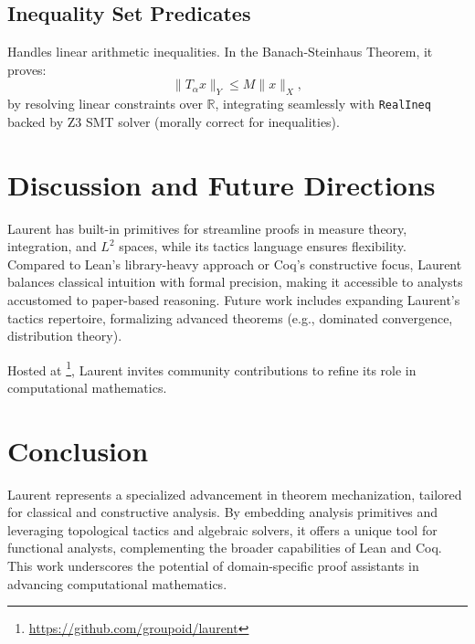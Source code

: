 \documentclass{article}
\begin{document}
\subsection{Inequality Set Predicates}

Handles linear arithmetic inequalities. In the Banach-Steinhaus Theorem, it proves:
\[
\| T_\alpha x \|_Y \leq M \| x \|_X,
\]
by resolving linear constraints over $\mathbb{R}$, integrating seamlessly with \texttt{RealIneq} backed by Z3 SMT solver (morally correct for inequalities).

\section{Discussion and Future Directions}
Laurent has built-in primitives for streamline proofs in measure theory, integration, and $L^2$ spaces,
while its tactics language ensures flexibility. Compared to Lean’s library-heavy approach
or Coq’s constructive focus, Laurent balances classical intuition with formal precision,
making it accessible to analysts accustomed to paper-based reasoning. Future work includes
expanding Laurent’s tactics repertoire, formalizing advanced
theorems (e.g., dominated convergence, distribution theory).

Hosted at \footnote{\url{https://github.com/groupoid/laurent}}, Laurent invites community
contributions to refine its role in computational mathematics.

\section{Conclusion}
Laurent represents a specialized advancement in theorem mechanization,
tailored for classical and constructive analysis. By embedding analysis
primitives and leveraging topological tactics and algebraic solvers,
it offers a unique tool for functional analysts, complementing the
broader capabilities of Lean and Coq. This work underscores the
potential of domain-specific proof assistants in advancing computational
mathematics.
\end{document}
